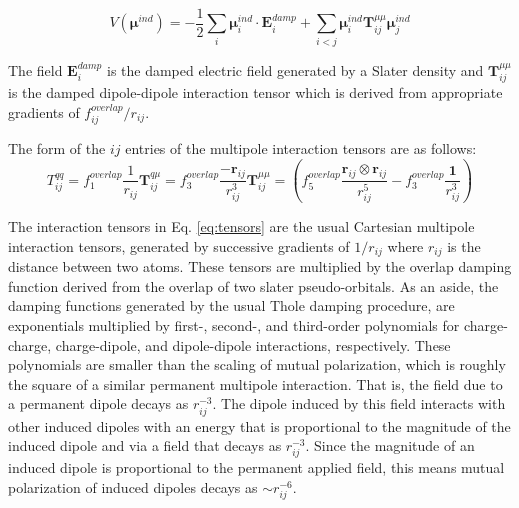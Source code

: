 \documentclass[journal=jctcce,manuscript=article]{achemso}
\begin{document}
\begin{equation}
  V(\bm{\mu}^{ind})=-\frac12\sum_i \bm{\mu}_i^{ind}\cdot \bm{E}_i^{damp} + \sum_{i<j}\bm{\mu}^{ind}_i \bm{T}^{\mu\mu}_{ij}\bm{\mu}^{ind}_j
  \label{eq:induced_dipoles}
\end{equation}

The field $\bm{E}_i^{damp}$ is the damped electric field generated by a Slater density
and $\bm{T}^{\mu\mu}_{ij}$ is the damped dipole-dipole interaction tensor which is derived from appropriate
gradients of $f_{ij}^{overlap}/r_{ij}$.

The form of the $ij$ entries of the multipole interaction tensors are as follows:
\begin{subequations}
  \begin{equation}
    T^{qq}_{ij}=f_1^{overlap}\frac{1}{r_{ij}}
    \label{eq:tensors_a}
  \end{equation}
  \begin{equation}
  \bm{T}^{q\mu}_{ij}=f_3^{overlap}\frac{-\bm{r}_{ij}}{r_{ij}^3}
    \label{eq:tensors_b}
  \end{equation}
  \begin{equation}
  \bm{T}^{\mu\mu}_{ij}=\left(f_5^{overlap}\frac{\bm{r}_{ij}\otimes\bm{r}_{ij}}{r_{ij}^5}-f_3^{overlap}\frac{\bm{1}}{r_{ij}^3}\right)
    \label{eq:tensors_c}
  \end{equation}
  \label{eq:tensors}
\end{subequations}

The interaction tensors in Eq. \ref{eq:tensors} are the usual Cartesian multipole interaction
tensors, generated by successive gradients of $1/r_{ij}$ where $r_{ij}$ is the distance between
two atoms. These tensors are multiplied by the overlap damping function derived from the overlap
of two slater pseudo-orbitals\cite{rackers2021polarizable}.
As an aside, the damping functions generated by the usual Thole damping procedure\cite{thole1981molecular},
are exponentials multiplied by first-, second-, and third-order polynomials
for charge-charge, charge-dipole, and dipole-dipole interactions, respectively.\cite{thole1981molecular}
These polynomials are smaller than the scaling of mutual polarization, which is roughly the square
of a similar permanent multipole interaction. That is, the field due to a permanent dipole
decays as $r_{ij}^{-3}$. The dipole induced by this field interacts with other induced dipoles
with an energy that is proportional to the magnitude of the induced dipole and via a field
that decays as $r_{ij}^{-3}$. Since the magnitude of an induced dipole is proportional to
the permanent applied field, this means mutual polarization of induced dipoles decays as $\sim$$r_{ij}^{-6}$.
\end{document}
